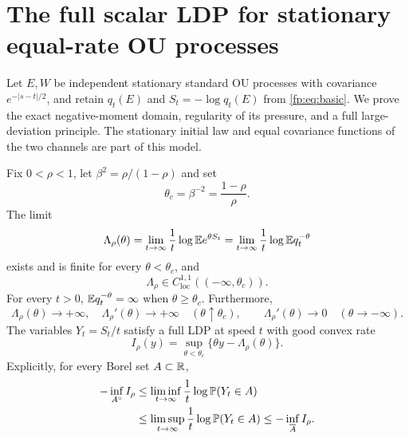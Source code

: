 \section{The full scalar LDP for stationary equal-rate OU processes}\label{fp:app:ldp}
Let $E,W$ be independent stationary standard OU processes with covariance
$e^{-|s-t|/2}$, and retain $q_t(E)$ and $S_t=-\log q_t(E)$ from
\eqref{fp:eq:basic}. We prove the exact negative-moment domain, regularity
of its pressure, and a full large-deviation principle. The stationary
initial law and equal covariance functions of the two channels are part
of this model.

\begin{theorem}\label{fp:thm:scalar-ldp}
Fix $0<\rho<1$, let $\beta^2=\rho/(1-\rho)$ and set
\[
 \theta_c=\beta^{-2}=\frac{1-\rho}{\rho}.
\]
The limit
\begin{equation}\label{fp:eq:Lambda}
 \Lambda_\rho(\theta)
 =\lim_{t\to\infty}\frac1t\log\mathbb E e^{\theta S_t}
 =\lim_{t\to\infty}\frac1t\log\mathbb E q_t^{-\theta}
\end{equation}
exists and is finite for every $\theta<\theta_c$, and
\begin{equation}\label{fp:eq:Lambda-c11}
 \Lambda_\rho\in C^{1,1}_{\mathrm{loc}}(( -\infty,\theta_c)).
\end{equation}
For every $t>0$, $\mathbb E q_t^{-\theta}=\infty$ when $\theta\ge\theta_c$. Furthermore,
\begin{equation}\label{fp:eq:Lambda-boundaries}
 \Lambda_\rho(\theta)\to+\infty,\quad
 \Lambda_\rho'(\theta)\to+\infty\quad(\theta\uparrow\theta_c),
 \qquad
 \Lambda_\rho'(\theta)\to0\quad(\theta\to-\infty).
\end{equation}
The variables $Y_t=S_t/t$ satisfy a full LDP at speed $t$ with good convex rate
\begin{equation}\label{fp:eq:rate}
 I_\rho(y)=\sup_{\theta<\theta_c}\{\theta y-\Lambda_\rho(\theta)\}.
\end{equation}
Explicitly, for every Borel set $A\subset\mathbb R$,
\begin{align}
 -\inf_{A^\circ}I_\rho
 &\le\liminf_{t\to\infty}\frac1t\log\mathbb P(Y_t\in A)\notag\\
 &\le\limsup_{t\to\infty}\frac1t\log\mathbb P(Y_t\in A)
 \le-\inf_{\overline A}I_\rho.\label{fp:eq:full-ldp}
\end{align}
\end{theorem}

